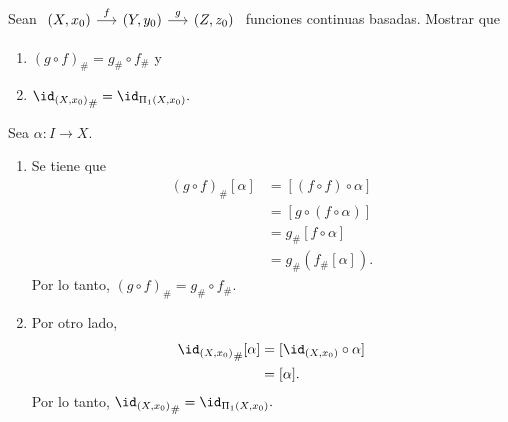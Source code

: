 \begin{ejercicio}
    \label{eje:Pi_1_es_invariante}
        Sean 
        $
            \begin{tikzcd}[column sep=0.5cm]
            (X,x_0) \arrow[r, "f"] & (Y,y_0)\arrow[r, "g"] & (Z,z_0)
        \end{tikzcd}
        $
        funciones continuas basadas. Mostrar que
        \begin{enumerate}
            \item [(1)] ${(g\circ f)}_{\#}=g_{\#}\circ f_{\#}$ y
            \item[(2)] ${\id_{(X,x_0)}}_{\#}=\id_{\Pi_1(X,x_0)}.$ 
        \end{enumerate}
    \end{ejercicio}
\begin{demostracion}
Sea $\alpha:I\to X$. 
\begin{enumerate}[label=(\arabic*)]
    \item Se tiene que
    \begin{align*}
        (g\circ f)_{\#}[\alpha]&=[(f\circ f)\circ \alpha]\\
        &=[g\circ(f\circ\alpha)]\\
        &=g_{\#}[f\circ \alpha]\\
        &=g_{\#}(f_\#[\alpha]).
    \end{align*}
    Por lo tanto, ${(g\circ f)}_{\#}=g_{\#}\circ f_{\#}$.
    \item Por otro lado,
    \begin{align*}
        {\id_{(X,x_0)}}_{\#}[\alpha]&=[\id_{(X,x_0)}\circ\alpha]\\
        &=[\alpha].
    \end{align*}
    Por lo tanto, ${\id_{(X,x_0)}}_{\#}=\id_{\Pi_1(X,x_0)}.$ 
\end{enumerate}
\end{demostracion}
